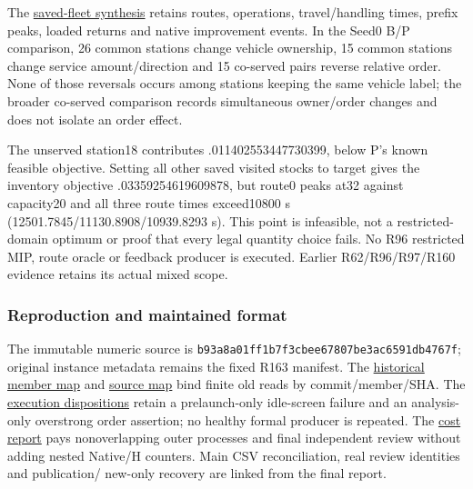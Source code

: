 \documentclass[
  american,
  11pt,
]{article}
\begin{document}
The
\href{https://github.com/yifanXovo/TailoredExact/blob/codex/round172-journal-manuscript/results/unified_exact_round164/structural_synthesis.json}{saved-fleet
synthesis} retains routes, operations, travel/handling times, prefix
peaks, loaded returns and native improvement events. In the Seed0 B/P
comparison, 26 common stations change vehicle ownership, 15 common
stations change service amount/direction and 15 co-served pairs reverse
relative order. None of those reversals occurs among stations keeping
the same vehicle label; the broader co-served comparison records
simultaneous owner/order changes and does not isolate an order effect.

The unserved station18 contributes .011402553447730399, below P's known
feasible objective. Setting all other saved visited stocks to target
gives the inventory objective .03359254619609878, but route0 peaks at32
against capacity20 and all three route times exceed10800 s
(12501.7845/11130.8908/10939.8293 s). This point is infeasible, not a
restricted-domain optimum or proof that every legal quantity choice
fails. No R96 restricted MIP, route oracle or feedback producer is
executed. Earlier R62/R96/R97/R160 evidence retains its actual mixed
scope.

\subsubsection{Reproduction and maintained
format}\label{reproduction-and-maintained-format}

The immutable numeric source is
\texttt{b93a8a01\allowbreak{}ff1b7f3c\allowbreak{}bee67807\allowbreak{}be3ac659\allowbreak{}1db4767f};
original instance metadata remains the fixed R163 manifest. The
\href{https://github.com/yifanXovo/TailoredExact/blob/codex/round172-journal-manuscript/results/unified_exact_round164/historical_member_access.json}{historical
member map} and
\href{https://github.com/yifanXovo/TailoredExact/blob/codex/round172-journal-manuscript/results/unified_exact_round164/historical_source_map.json}{source
map} bind finite old reads by commit/member/SHA. The
\href{https://github.com/yifanXovo/TailoredExact/blob/codex/round172-journal-manuscript/results/unified_exact_round164/execution_dispositions.json}{execution
dispositions} retain a prelaunch-only idle-screen failure and an
analysis-only overstrong order assertion; no healthy formal producer is
repeated. The
\href{https://github.com/yifanXovo/TailoredExact/blob/codex/round172-journal-manuscript/results/unified_exact_round164/cost_report.json}{cost
report} pays nonoverlapping outer processes and final independent review
without adding nested Native/H counters. Main CSV reconciliation, real
review identities and publication/ new-only recovery are linked from the
final report.
\end{document}
